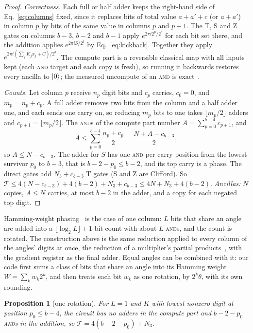 \documentclass[aps,prx,twocolumn,superscriptaddress,nofootinbib,longbibliography]{revtex4-2}
\newtheorem{proposition}[theorem]{Proposition}
\theoremstyle{remark}
\newcommand{\AND}{\textup{\textsc{and}}}
\newcommand{\Tc}{\mathcal{T}}
\begin{document}
\begin{proof}
\emph{Correctness.} Each full or half adder keeps the right-hand side of
Eq.~\eqref{eq:columns} fixed, since it replaces bits of total value $a+a'+c$ (or $a+a'$) in
column $p$ by bits of the same value in columns $p$ and $p+1$. The T, S and Z gates on columns
$b-3$, $b-2$ and $b-1$ apply $e^{2\pi i2^p/2^b}$ for each bit set there, and the addition
applies $e^{2\pi iS/2^b}$ by Eq.~\eqref{eq:kickback}. Together they apply
$e^{2\pi i(\sum_jK_jx_j+C)/2^b}$. The compute part is a reversible classical map with all
inputs kept (each \AND{} target and each copy is fresh), so running it backwards restores every
ancilla to $\ket0$; the measured uncompute of an \AND{} is exact~\cite{Gidney2018}.

\emph{Counts.} Let column $p$ receive $n_p$ digit bits and $c_p$ carries, $c_0=0$, and
$m_p=n_p+c_p$. A full adder removes two bits from the column and a half adder one, and each
sends one carry on, so reducing $m_p$ bits to one takes $\lfloor m_p/2\rfloor$ adders and
$c_{p+1}=\lfloor m_p/2\rfloor$. The \AND{}s of the compute part number
$A=\sum_{p=0}^{b-4}c_{p+1}$, and
\begin{equation}
  A\le\sum_{p=0}^{b-4}\frac{n_p+c_p}{2}=\frac{N+A-c_{b-3}}{2},
\end{equation}
so $A\le N-c_{b-3}$. The adder for $S$ has one \AND{} per carry position from the lowest
survivor $p_0$ to $b-3$, that is $b-2-p_0\le b-2$, and its top carry is a phase. The direct
gates add $N_3+c_{b-3}$ T gates (S and Z are Clifford). So
$\Tc\le4(N-c_{b-3})+4(b-2)+N_3+c_{b-3}\le4N+N_3+4(b-2)$.
\emph{Ancillas:} $N$ copies, $A\le N$ carries, at most $b-2$ in the adder, and a copy for each
negated top digit.
\end{proof}

Hamming-weight phasing~\cite{Gidney2018,Kivlichan2020} is the case of one column: $L$ bits
that share an angle are added into a $\lfloor\log_2L\rfloor+1$-bit count with about $L$
\AND{}s, and the count is rotated. The construction above is the same reduction applied to
every column of the angles' digits at once, the reduction of a multiplier's partial
products~\cite{Wallace1964}, with the gradient register as the final adder. Equal angles can be
combined with it: our code first sums a class of bits that share an angle into its Hamming
weight $W=\sum_kw_k2^k$, and then treats each bit $w_k$ as one rotation, by $2^k\theta$, with its
own rounding.

\begin{proposition}[one rotation]\label{prop:one}
For $L=1$ and $K$ with lowest nonzero digit at position $p_0\le b-4$, the circuit has no adders
in the compute part and $b-2-p_0$ \AND{}s in the addition, so $\Tc=4(b-2-p_0)+N_3$.
\end{proposition}
\end{document}
